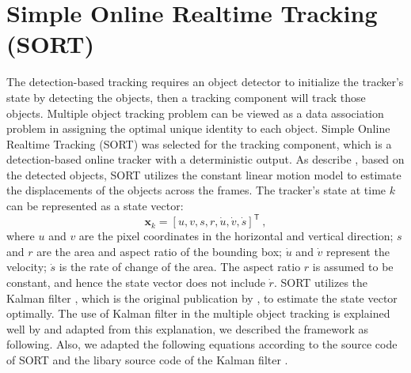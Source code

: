 \section{Simple Online Realtime Tracking (SORT)}
\label{sec:background/section_b}

The detection-based tracking requires an object detector to initialize the tracker's state by detecting the objects, then a tracking component will track those objects. Multiple object tracking problem can be viewed as a data association problem in assigning the optimal unique identity to each object. Simple Online Realtime Tracking (SORT) was selected for the tracking component, which is a detection-based online tracker with a deterministic output. As \citeauthor{bewley_simple_2016} describe \cite{bewley_simple_2016}, based on the detected objects, SORT utilizes the constant linear motion model to estimate the displacements of the objects across the frames. The tracker's state at time $k$ can be represented as a state vector:
\begin{equation}
\mathbf{x}_{k} = [u, v, s, r, \dot{u}, \dot{v}, \dot{s}]^\mathsf{T}~,
\label{eqn:state_vector}
\end{equation}
where $u$ and $v$ are the pixel coordinates in the horizontal and vertical direction; $s$ and $r$ are the area and aspect ratio of the bounding box; $\dot{u}$ and $\dot{v}$ represent the velocity; $\dot{s}$ is the rate of change of the area. The aspect ratio $r$ is assumed to be constant, and hence the state vector does not include $\dot{r}$. SORT utilizes the Kalman filter \cite{kalman_new_1960}, which is the original publication by \citeauthor{kalman_new_1960}, to estimate the state vector optimally. The use of Kalman filter in the multiple object tracking is explained well by \cite{li_multiple_2010} and adapted from this explanation, we described the framework as following. Also, we adapted the following equations according to the source code of SORT \cite{abewley_abewleysort_2021} and the libary source code of the Kalman filter \cite{labbe_rlabbefilterpy_2021}.

